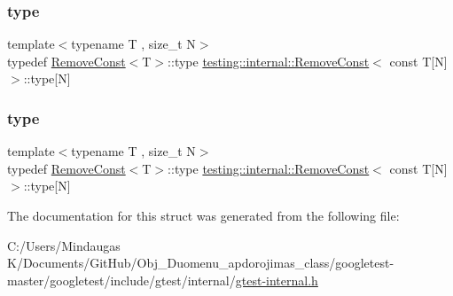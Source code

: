 \mbox{\label{structtesting_1_1internal_1_1_remove_const_3_01const_01_t[_n]_4_ac976b53cb5d031a120fafbe790650068}} 
\subsubsection{\texorpdfstring{type}{type}\hspace{0.1cm}{\footnotesize\ttfamily [2/3]}}
{\footnotesize\ttfamily template$<$typename T , size\+\_\+t N$>$ \\
typedef \mbox{\hyperlink{structtesting_1_1internal_1_1_remove_const}{Remove\+Const}}$<$T$>$\+::type \mbox{\hyperlink{structtesting_1_1internal_1_1_remove_const}{testing\+::internal\+::\+Remove\+Const}}$<$ const T\mbox{[}N\mbox{]}$>$\+::type\mbox{[}N\mbox{]}}

\mbox{\label{structtesting_1_1internal_1_1_remove_const_3_01const_01_t[_n]_4_ac976b53cb5d031a120fafbe790650068}} 
\subsubsection{\texorpdfstring{type}{type}\hspace{0.1cm}{\footnotesize\ttfamily [3/3]}}
{\footnotesize\ttfamily template$<$typename T , size\+\_\+t N$>$ \\
typedef \mbox{\hyperlink{structtesting_1_1internal_1_1_remove_const}{Remove\+Const}}$<$T$>$\+::type \mbox{\hyperlink{structtesting_1_1internal_1_1_remove_const}{testing\+::internal\+::\+Remove\+Const}}$<$ const T\mbox{[}N\mbox{]}$>$\+::type\mbox{[}N\mbox{]}}



The documentation for this struct was generated from the following file\+:\begin{DoxyCompactItemize}
\item 
C\+:/\+Users/\+Mindaugas K/\+Documents/\+Git\+Hub/\+Obj\+\_\+\+Duomenu\+\_\+apdorojimas\+\_\+class/googletest-\/master/googletest/include/gtest/internal/\mbox{\hyperlink{googletest-master_2googletest_2include_2gtest_2internal_2gtest-internal_8h}{gtest-\/internal.\+h}}\end{DoxyCompactItemize}
